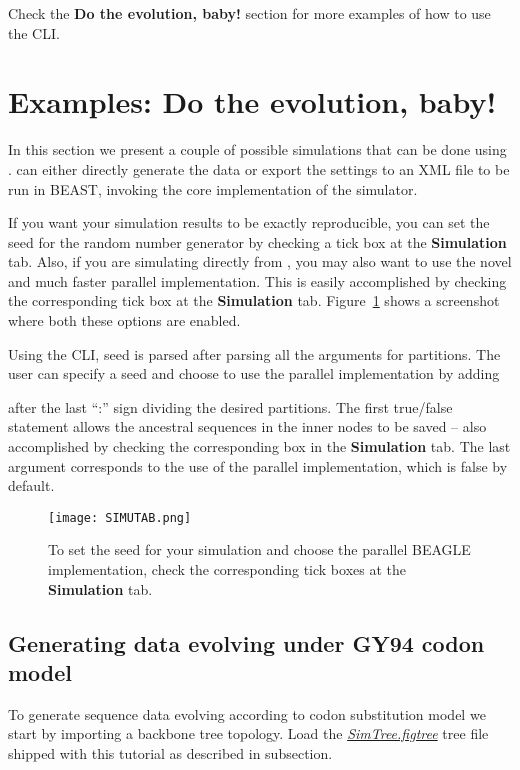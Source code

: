 Check the \textbf{Do the evolution, baby!} section for more examples of how to use the CLI.

\section{Examples: Do the evolution, baby!}

In this section we present a couple of possible simulations that can be done using {\bussname}.
{\bussname} can either directly generate the data or export the settings to an XML file to be run in BEAST, invoking the core implementation of the simulator.

If you want your simulation results to be exactly reproducible, you can set the seed for the random number generator by checking a tick box at the {\bf Simulation} tab.
Also, if you are simulating directly from {\bussname}, you may also want to use the novel and much faster parallel implementation.
This is easily accomplished by checking the corresponding tick box at the {\bf Simulation} tab.
Figure~\ref{fig:simutab} shows a screenshot where both these options are enabled.

Using the CLI, seed is parsed after parsing all the arguments for partitions.
The user can specify a seed and choose to use the parallel implementation by adding 
\begin{code} %
[<output-file-name>] [<seed>] [<true|false>] [<true|false>]
\end{code}
after the last ``:'' sign dividing the desired partitions.
The first true/false statement allows the ancestral sequences in the inner nodes to  be saved -- also accomplished by checking the corresponding box in the {\bf Simulation} tab.
The last argument corresponds to the use of the parallel implementation, which is false by default. 
\begin{figure}[H]
\centering
\texttt{[image: SIMUTAB.png]} 
\caption{To set the seed for your simulation and choose the parallel BEAGLE implementation, check the corresponding tick boxes at the {\bf Simulation} tab.}
\label{fig:simutab}
\end{figure}
\subsection{Generating data evolving under GY94 codon model}
To generate sequence data evolving according to codon substitution model we start by importing a backbone tree topology. 
Load the \href{http://rega.kuleuven.be/cev/ecv/software/buss_files/simtree.figtree}{\emph{SimTree.figtree}} tree file shipped with this tutorial as described in \emph{\loading} subsection.   

